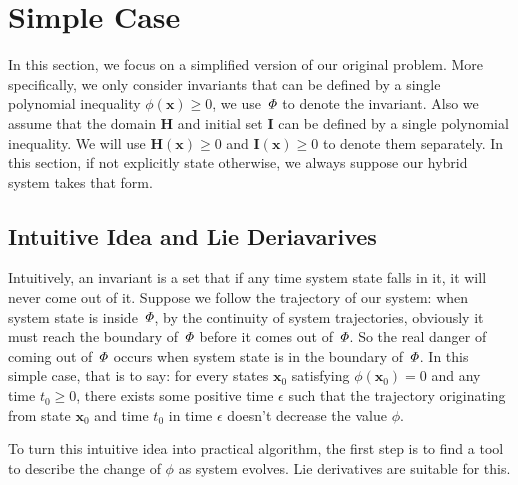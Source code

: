 \documentclass{jssc}
\begin{document}
\section{Simple Case}
\label{sec:simple}
In this section, we focus on a simplified version of our original problem. More specifically, we only consider invariants that can be defined by a single polynomial inequality $\phi(\boldsymbol{x}) \geq 0$, we use ${\it \Phi}$ to denote the invariant. Also we assume that the domain $\boldsymbol{H}$ and initial set $\boldsymbol{I}$ can be defined by a single polynomial inequality. We will use $\boldsymbol{H}(\boldsymbol{x}) \geq 0$ and $\boldsymbol{I}(\boldsymbol{x}) \geq 0$ to denote them separately. In this section, if not explicitly state otherwise, we always suppose our hybrid system takes that form.

\subsection{Intuitive Idea and Lie Deriavarives}
Intuitively, an invariant is a set that if any time system state falls in it, it will never come out of it. Suppose we follow the trajectory of our system: when system state is inside  ${\it \Phi}$, by the continuity of system trajectories, obviously it must reach the boundary of ${\it \Phi}$ before it comes out of ${\it \Phi}$. So the real danger of coming out of ${\it \Phi}$ occurs when system state is in the boundary of ${\it \Phi}$. In this simple case, that is to say: for every states $\boldsymbol{x}_0$ satisfying $\phi(\boldsymbol{x}_0) = 0$ and any time $t_0 \geq 0$, there exists some positive time $\epsilon$ such that the trajectory originating from state $\boldsymbol{x}_0$ and time $t_0$ in time $\epsilon$ doesn't decrease the value $\phi$. 

To turn this intuitive idea into practical algorithm, the first step is to find a tool to describe the change of $\phi$ as system evolves. Lie derivatives are suitable for this.
\end{document}
